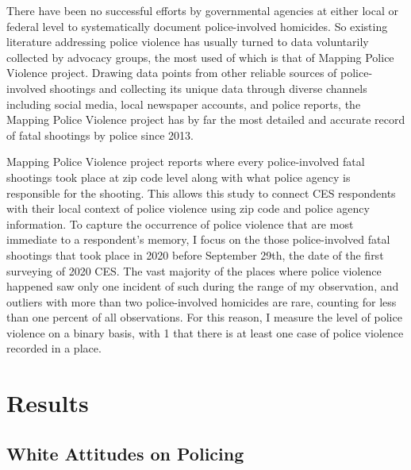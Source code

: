 \documentclass[
  12pt,
]{article}
\begin{document}
There have been no successful efforts by governmental agencies at either
local or federal level to systematically document police-involved
homicides. So existing literature addressing police violence has usually
turned to data voluntarily collected by advocacy groups, the most used
of which is that of Mapping Police Violence project. Drawing data points
from other reliable sources of police-involved shootings and collecting
its unique data through diverse channels including social media, local
newspaper accounts, and police reports, the Mapping Police Violence
project has by far the most detailed and accurate record of fatal
shootings by police since 2013.

Mapping Police Violence project reports where every police-involved
fatal shootings took place at zip code level along with what police
agency is responsible for the shooting. This allows this study to
connect CES respondents with their local context of police violence
using zip code and police agency information. To capture the occurrence
of police violence that are most immediate to a respondent's memory, I
focus on the those police-involved fatal shootings that took place in
2020 before September 29th, the date of the first surveying of 2020 CES.
The vast majority of the places where police violence happened saw only
one incident of such during the range of my observation, and outliers
with more than two police-involved homicides are rare, counting for less
than one percent of all observations. For this reason, I measure the
level of police violence on a binary basis, with 1 that there is at
least one case of police violence recorded in a place.

\hypertarget{results}{%
\section{Results}\label{results}}

\hypertarget{white-attitudes-on-policing}{%
\subsection{White Attitudes on
Policing}\label{white-attitudes-on-policing}}
\end{document}
